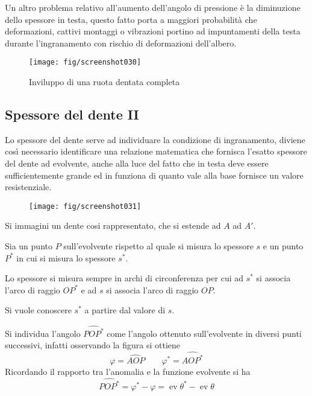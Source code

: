 \documentclass[a4paper, 15pt]{article}
\DeclareMathOperator{\ev}{ev}
\begin{document}
\begin{adjustwidth}{2in}{}
		Un altro problema relativo all'aumento dell'angolo di pressione è la diminuzione dello spessore in testa, questo fatto porta a maggiori probabilità che deformazioni, cattivi montaggi o vibrazioni portino ad impuntamenti della testa durante l'ingranamento con rischio di deformazioni dell'albero. 
\end{adjustwidth}		 
		\begin{figure}[H]
			\centering
			\texttt{[image: fig/screenshot030]}
			\caption{Inviluppo di una ruota dentata completa}
			\label{fig:screenshot030}
		\end{figure}
\newpage
\subsection{Spessore del dente II}
\begin{adjustwidth}{2in}{}			
		Lo spessore del dente serve ad individuare la condizione di ingranamento, diviene così necessario identificare una relazione matematica che fornisca l'esatto spessore del dente ad evolvente, anche alla luce del fatto che in testa deve essere sufficientemente grande ed in funziona di quanto vale alla base fornisce un valore resistenziale.
		\begin{figure}[H]
			\centering
			\texttt{[image: fig/screenshot031]}
			\label{fig:screenshot031}
		\end{figure}		
		Si immagini un dente cosi rappresentato, che si estende ad $A$ ad $A'$.
		
		Sia un punto $P$ sull'evolvente rispetto al quale si misura lo spessore $s$ e un punto $P^*$ in cui si misura lo spessore $s^*$. 
		
		Lo spessore si misura sempre in archi di circonferenza per cui ad $s^*$ si associa l'arco di raggio $OP^*$ e ad $s$ si associa l'arco di raggio $OP$.
		
		Si vuole conoscere $s^*$ a partire dal valore di $s$. \newline 
		
		Si individua l'angolo $\hat{POP^*}$ come l'angolo ottenuto sull'evolvente in diversi punti successivi, infatti osservando la figura si ottiene 
		\[\varphi = \hat{AOP} \qquad \varphi^* = \hat{AOP^*}\] 
		Ricordando il rapporto tra l'anomalia e la funzione evolvente si ha
		\[\hat{POP^*} = \varphi^*-\varphi = \ev\theta^*-\ev\theta\] 
		

\end{adjustwidth}
\end{document}
